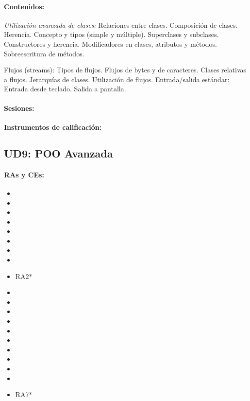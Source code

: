 	\paragraph{Contenidos:}
		\emph{Utilización avanzada de clases:}
		Relaciones entre clases. Composición de clases.
		Herencia. Concepto y tipos (simple y múltiple).
		Superclases y subclases.
		Constructores y herencia.
		Modificadores en clases, atributos y métodos.
		Sobreescritura de métodos.

		Flujos (streams): Tipos de flujos. Flujos de bytes y de caracteres. Clases relativas a flujos. Jerarquías de clases. Utilización de flujos.
		Entrada/salida estándar: Entrada desde teclado. Salida a pantalla.


	\paragraph{Sesiones:}
	\paragraph{Instrumentos de calificación:}


\newpage
\subsection{UD9: POO Avanzada}

	\paragraph{RAs y CEs:}
	\begin{itemize}[itemsep=0.1em, topsep=0.1em]

		\item\RAUNOf
		\item\RAUNOi		
		\item\RATRESe
		\item\RATRESf
		\item\RATRESg
		\item\RACINCOa
		\item\RACINCOb
		\item\RACINCOc		
		\item RA2*
		\item\RACUATROa
		\item\RACUATROb
		\item\RACUATROc
		\item\RACUATROd
		\item\RACUATROe
		\item\RACUATROf
		\item\RACUATROg
		\item\RACUATROh
		\item\RACUATROi
		\item\RASEISf
		\item RA7*
	\end{itemize}


